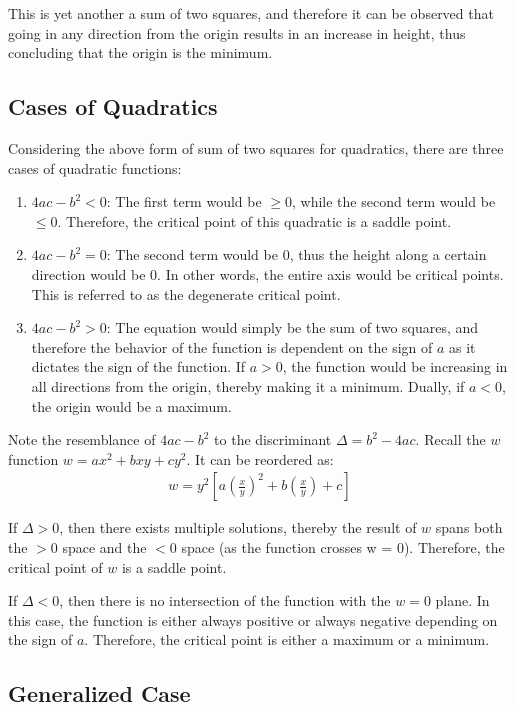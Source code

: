 \documentclass[12pt]{article}
\theoremstyle{definition}
\begin{document}
	This is yet another a sum of two squares, and therefore it can be observed that going in any direction from the origin results in an increase in height, thus concluding that the origin is the minimum.
	
	\subsection{Cases of Quadratics}
	
	Considering the above form of sum of two squares for quadratics, there are three cases of quadratic functions:
	\begin{enumerate}
		\item $4ac - b^2 < 0$: The first term would be $\geq 0$, while the second term would be $\leq 0$. Therefore, the critical point of this quadratic is a saddle point.
		\item $4ac - b^2 = 0$: The second term would be $0$, thus the height along a certain direction would be $0$. In other words, the entire axis would be critical points. This is referred to as the degenerate critical point.
		\item $4ac - b^2 > 0$: The equation would simply be the sum of two squares, and therefore the behavior of the function is dependent on the sign of $a$ as it dictates the sign of the function. If $a > 0$, the function would be increasing in all directions from the origin, thereby making it a minimum. Dually, if $a < 0$, the origin would be a maximum.
	\end{enumerate}
	
	Note the resemblance of $4ac - b^2$ to the discriminant $\Delta = b^2 - 4ac$. Recall the $w$ function $w = ax^2 + bxy + cy^2$. It can be reordered as:
	\begin{gather*}
		w = y^2 [a(\frac{x}{y})^2 + b(\frac{x}{y})+ c]
	\end{gather*}
	
	If $\Delta > 0$, then there exists multiple solutions, thereby the result of $w$ spans both the $> 0$ space and the $< 0$ space (as the function crosses w = 0). Therefore, the critical point of $w$ is a saddle point.
	
	If $\Delta < 0$, then there is no intersection of the function with the $w = 0$ plane. In this case, the function is either always positive or always negative depending on the sign of $a$. Therefore, the critical point is either a maximum or a minimum.
	
	\subsection{Generalized Case}
	
\end{document}
